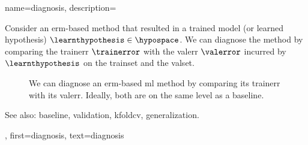 {name={diagnosis},
	description={Consider an \gls{erm}-based method that resulted in a trained \gls{model} 
		(or learned \gls{hypothesis}) $\learnthypothesis \in \hypospace$. We can diagnose the 
		method by comparing the \gls{trainerr} $\trainerror$ with the \gls{valerr} $\valerror$ 
		incurred by $\learnthypothesis$ on the \gls{trainset} and the \gls{valset}. 
		\begin{figure}[H]
			\begin{center}
			\end{center}
		\caption{We can diagnose an \gls{erm}-based \gls{ml} method by comparing its \gls{trainerr} 
			with its \gls{valerr}. Ideally, both are on the same level as a \gls{baseline}.\label{fig_diagnosis_dict}}
		\end{figure}
		See also: \gls{baseline}, \gls{validation}, \gls{kfoldcv}, \gls{generalization}.},
	first={diagnosis},
	text={diagnosis}
} 


